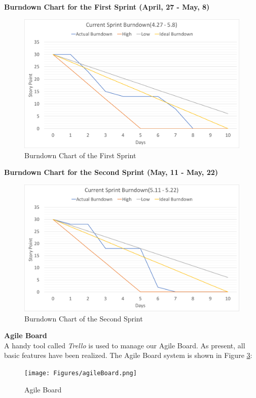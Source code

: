 \documentclass{report}
\begin{document}
\clearpage
\textbf{Burndown Chart for the First Sprint (April, 27 - May, 8)}
\begin{figure}[htp]
\centering
\includegraphics[width=\textwidth]{Figures/sprint1Burndown.pdf}
\caption{Burndown Chart of the First Sprint}
\label{fig:sprint1Burndown}
\end{figure}

\clearpage
\textbf{Burndown Chart for the Second Sprint (May, 11 - May, 22)}
\begin{figure}[htp]
\centering
\includegraphics[width=\textwidth]{Figures/sprint2Burndown.pdf}
\caption{Burndown Chart of the Second Sprint}
\label{fig:sprint2Burndown}
\end{figure}

\clearpage
\textbf{Agile Board}
\\
A handy tool called \textit{Trello} is used to manage our Agile Board. As present, all basic features have been realized. The Agile Board system is shown in Figure \ref{fig:agileBoard}:

\begin{figure}[htp]
\centering
\texttt{[image: Figures/agileBoard.png]}
\caption{Agile Board}
\label{fig:agileBoard}
\end{figure}
\end{document}
